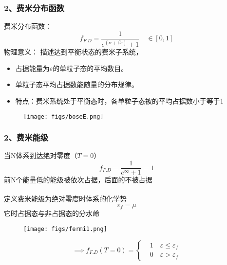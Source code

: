 \begin{frame}
  \frametitle{ 2、费米分布函数}
  \begin{minipage}[b]{0.49\textwidth}
  \alert{费米分布函数：} 
  \[f_{F.D} =  \frac{1}{e^{(\alpha +\beta \varepsilon)}+1} \quad \in \left[0,1 \right]\]
    \alert{物理意义：} 描述达到平衡状态的费米子系统，
    \begin{itemize}
      \item 占据能量为$\varepsilon$的单粒子态的平均数目。
      \item 单粒子态平均占据数能随量的分布规律。
      \item 特点：费米系统处于平衡态时，各单粒子态被的平均占据数小于等于1
    \end{itemize}
    \end{minipage} 
    \begin{minipage}[b]{0.49\textwidth}
      \begin{figure}[htbp]
        \centering
        \texttt{[image: figs/boseE.png]}
      \end{figure}
      \end{minipage}
\end{frame}  

\begin{frame}
  \frametitle{ 2、费米能级}
\begin{minipage}[b]{0.49\textwidth}
当N体系到达绝对零度（$T=0$）
$$f_{F.D} =  \frac{1}{e^{\infty}+1} = 1$$
前N个能量低的能级被依次占据，后面的不被占据\\
~~\\ 
定义费米能级为绝对零度时体系的化学势
$$\varepsilon_f = \mu $$
它时占据态与非占据态的分水岭 
\end{minipage}
\begin{minipage}[b]{0.49\textwidth}
  \begin{figure}
    \texttt{[image: figs/fermi1.png]}   
\end{figure}
\[ \implies \boxed{ f_{F.D}(T=0) = \left\{ \begin{aligned}
  & 1 \quad \varepsilon \le \varepsilon_f \\ 
  & 0 \quad \varepsilon > \varepsilon_f
\end{aligned}\right.} \]
\end{minipage}
\end{frame} 

